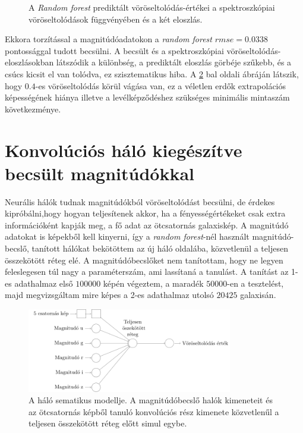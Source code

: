 \documentclass[12pt,letterpaper,twoside,openright]{book}
\begin{document}
\begin{figure}[]
\begin{subfigure}[b]{0.3\textwidth}
    \label{fig:2}
  \end{subfigure}
  \caption{A \textit{Random forest} prediktált vöröseltolódás-értékei a spektroszkópiai vöröseltolódások függvényében és a két eloszlás.}
\label{rfp}
\end{figure}
 Ekkora torzítással a magnitúdóadatokon a \textit{random forest} $rmse = 0.0338$ pontossággal tudott becsülni. A becsült és a spektroszkópiai vöröseltolódás-eloszlásokban látszódik a különbség, a prediktált eloszlás görbéje szűkebb, és a csúcs kicsit el van tolódva, ez szisztematikus hiba. A \ref{rfp} bal oldali ábráján látszik, hogy $0.4$-es vöröseltolódás körül vágása van, ez a véletlen erdők extrapolációs képességének hiánya illetve a levélképződéshez szükséges minimális mintaszám következménye. 
 
 
 \section{Konvolúciós háló kiegészítve becsült magnitúdókkal}
 Neurális hálók tudnak magnitúdókból vöröseltolódást becsülni, de érdekes kipróbálni,hogy hogyan teljesítenek akkor, ha a fényességértékeket csak extra információként kapják meg, a fő adat az ötcsatornás galaxiskép. A magnitúdó adatokat is képekből kell kinyerni, így a \textit{random forest}-nél használt magnitúdó-becslő, tanított hálókat bekötöttem az új háló oldalába, közvetlenül a teljesen összekötött réteg elé. A magnitúdóbecslőket nem tanítottam, hogy ne legyen feleslegesen túl nagy a paraméterszám, ami lassítaná a tanulást. 
 \newline\indent 
 A tanítást az 1-es adathalmaz első $\num{100000}$ képén végeztem, a maradék $\num{50000}$-en a tesztelést, majd megvizsgáltam mire képes a 2-es adathalmaz utolsó $\num{20425}$ galaxisán.
 \begin{figure}[h!]
 \centering
 \includegraphics[width = 0.8\textwidth]{Figures/magnet.pdf}
 \caption{A háló sematikus modellje. A magnitúdóbecslő halók kimeneteit és az ötcsatornás képből tanuló konvolúciós rész kimenete közvetlenűl a teljesen összekötött réteg előtt simul egybe.}
 \label{fig:magnet}
 \end{figure}
\end{document}
